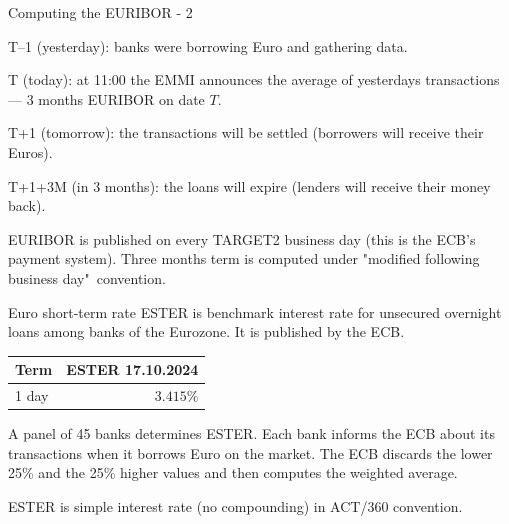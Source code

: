 \documentclass{beamer}
\begin{document}
\begin{frame}{Computing the EURIBOR - 2}
\centering
{}
	
\justify
T--1 (yesterday):  banks were borrowing Euro and gathering data.

T (today): at 11:00 the EMMI announces the average of yesterdays transactions --- 3 months EURIBOR on date $T$.

T+1 (tomorrow): the transactions will be settled (borrowers will receive their Euros).

T+1+3M (in 3 months): the loans will expire (lenders will receive their money back).

\justify
EURIBOR is published on every TARGET2 business day (this is the ECB's payment system). Three months term is computed under "modified following business day"\ convention.
\end{frame}



\begin{frame}{Euro short-term rate}
\justify
\alert{ESTER} is benchmark interest rate for unsecured overnight loans among banks of the Eurozone. It is published by the ECB.

\justify
\centering
\begin{tabular}{l|r}
Term  & ESTER 17.10.2024 \\ \hline
1 day & $3.415\%$
\end{tabular}

\justify
A panel of 45 banks determines ESTER. Each bank informs the ECB about its transactions when it borrows Euro on the market. The ECB discards the lower 25\%  and the 25\% higher values and then computes the weighted average.

\justify
ESTER is simple interest rate (no compounding) in ACT/360 convention.
\end{frame}
\end{document}
